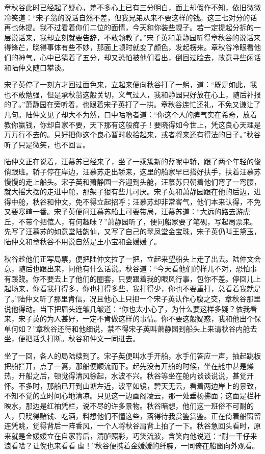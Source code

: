 \documentclass[12pt,UTF8]{ctexbook}
\begin{document}
{{{章秋谷此时已经起了疑心，差不多心上已有三分明白，面上却假作不知，依旧微微冷笑道：“宋子翁的说话自然不差，但我兄弟从来不要这样的钱。这三七对分的话再也休提。我不过看着你们二位的面情，今天和你装些幌子。若一定提起分拆的一层说话来，我却立刻就要告辞，不敢领教了。”宋子英和萧静园听得章秋谷的说话来得锋芒，晓得事体有些不妙，那面上顿时就变了颜色，发起楞来。章秋谷冷眼看他们的神气，心中已猜着了五分，却又恐怕被他们看出，倒回过脸去，故意寻些闲话和陆仲文随口攀谈。

宋子英停了一刻方才回过面色来，立起来便向秋谷打了一躬，道：“既是如此，我也不敢勉强，但是承秋翁这般关切，义气过人，我和静园只好放在心上，随后补报的了。”萧静园在旁听着，也跟着宋子英打了一拱。章秋谷连忙还礼，不免又谦让了几句。陆仲文见了却大不为然，口中咕噜者道：“你这个人的脾气实在希奇，放着教你赢钱，你却自家不要，天下那有这般痴子！要晓得如今世上，凭这良心天理是万万行不去的。只好把你这个良心暂时收拾起来，或者将来还有得法的日子。”秋谷听了只是微笑，也不回言。

陆仲文正在说着，汪慕苏已经来了，坐了一乘簇新的蓝呢中轿，跟了两个年轻的俊俏跟班。轿子停在岸边，汪慕苏走出轿来，这里的船家早已搭好扶手，扶着汪慕苏慢慢的走上船头。宋子英和萧静园一齐迎到头舱，汪慕苏只朝着他们弯了一弯腰，就大摇大摆的走进中舱，那架子狠有些儿可厌。宋子英和萧静园跟在他的后边，进得中舱，秋谷和仲文，免不得立起招呼；汪慕苏却非常客气，他们本来认得，不免又要寒暄一番。宋子英便问汪慕苏船上可要带局，汪慕苏道：“大远的路去游虎丘，不带个把倌人，有何趣味？”萧静园听了，便问船家要了笔砚，写起局票来。先写了汪慕苏的如意堂陆韵仙，又写了自己的翠凤堂金宝珠，宋子英仍叫王黛玉，陆仲文和章秋谷不用说自然是王小宝和金媛媛了。

秋谷趁他们正写局票，便把陆仲文拉了一把，立起来望船头上走了出去。陆仲文会意，随后也跟出来，问他有什么话说。秋谷道：“今天看他们的样儿不对，恐怕事有蹊跷。你不要去上了他们的圈套，只要跟着我的眼风行事，包你不差。停回儿上起场来，你看我打得多，你也打得多些，我打得少，你也不要重打，总看着我就是了。”陆仲文听了那里肯信，况且他心上只把一个宋子英认作心腹之交，章秋谷那里说他得动。当下把眉头连皱几皱道：“你也太小心了，为什么要这样多疑？依我看来，宋子英的为人甚好，一定不肯做这样的事情。你不要这般疑惑，我和他出个保单何如？”章秋谷还待和他细说，禁不得宋子英叫萧静园到船头上来请秋谷内舱去坐，便把话头打断。秋谷和仲文一同进去。

坐了一回，各人的局陆续到了。宋子英便叫水手开船，水手们答应一声，抽起跳板把船拦开，点了一篙，那船便顺流而下。起先没有开船的时候，坐在舱中甚是燥热，开船之后，顿觉得清风徐起，水波不兴。秋谷等坐在舱内谈谈说说，甚觉开怀。不多时，那船已开到山塘左近，波平如镜，碧天无云，看着两边岸上的景致，不知不觉的立时间心地清凉。只见这一边画阁凌云，那一处垂杨拂面；这面是栏杆映水，那边是红袖凭栏，说不尽的许多景物。秋谷暗想，他们这一班俗不可耐的人，只晓得赌钱、吃酒，料想他们不懂这些，落得待我赏鉴赏鉴。正在倚着船窗留连凭眺，觉得背后一阵香风，一个人将秋谷肩背上拍了一下。秋谷急回头看时，原来就是金媛嫒立在自家背后，清胪照彩，巧笑流波，含笑向他说道：“耐一干仔来浪看啥？让倪也来看看虐！”秋谷便携着金媛媛的纤腕，一同倚在船窗向外观看。

}}}
\end{document}
